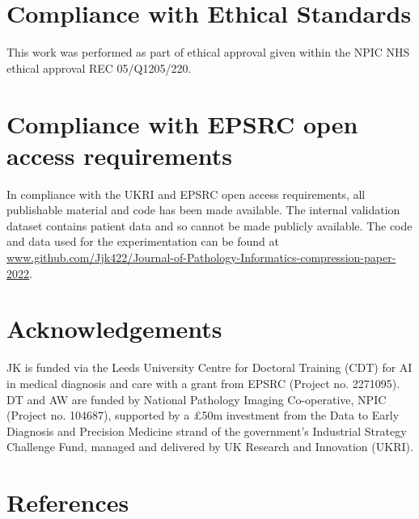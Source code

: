 \documentclass[review]{elsarticle}
\begin{document}
\section{Compliance with Ethical Standards}
This work was performed as part of ethical approval given within the NPIC NHS ethical approval REC 05/Q1205/220.

\section{Compliance with EPSRC open access requirements}
In compliance with the UKRI and EPSRC open access requirements, all publishable material and code has been made available. The internal validation dataset contains patient data and so cannot be made publicly available. The code and data used for the experimentation can be found at \url{www.github.com/Jjk422/Journal-of-Pathology-Informatics-compression-paper-2022}.

\section{Acknowledgements}
JK is funded via the Leeds University Centre for Doctoral Training (CDT) for AI in medical diagnosis and care with a grant from EPSRC (Project no. 2271095). \\
DT and AW are funded by National Pathology Imaging Co-operative, NPIC (Project no. 104687), supported by a £50m investment from the Data to Early Diagnosis and Precision Medicine strand of the government’s Industrial Strategy Challenge Fund, managed and delivered by UK Research and Innovation (UKRI).

\section{References}




\end{document}
